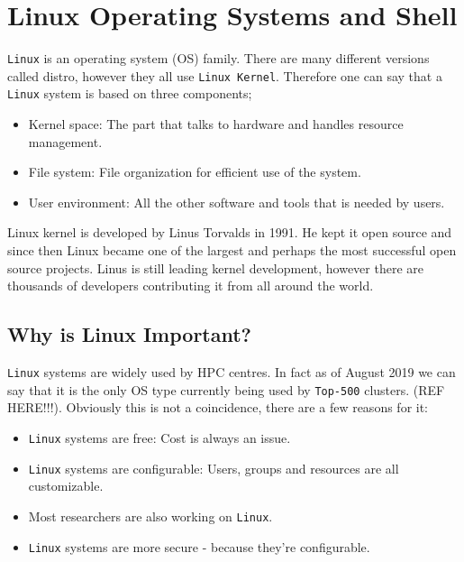 \chapter{Linux Operating Systems and Shell} \label{chap-linux}
\texttt{Linux} is an operating system (OS) family. There are many different versions 
called distro, however they all use \texttt{Linux Kernel}. Therefore one can say that 
a \texttt{Linux} system is based on three components;
\begin{itemize}
  \item Kernel space: The part that talks to hardware and handles resource management.
  \item File system: File organization for efficient use of the system.
  \item User environment: All the other software and tools that is needed by users.
\end{itemize}
Linux kernel is developed by Linus Torvalds in 1991. He kept it open source and since 
then Linux became one of the largest and perhaps the most successful open source 
projects. Linus is still leading kernel development, however there are thousands of 
developers contributing it from all around the world. 

\section{Why is Linux Important?}
\texttt{Linux} systems are widely used by HPC centres. In fact as of August 2019 we can 
say that it is the only OS type currently being used by \texttt{Top-500} clusters. 
(REF HERE!!!). 
\newline \newline
Obviously this is not a coincidence, there are a few reasons for it:
\begin{itemize}
  \item \texttt{Linux} systems are free: Cost is always an issue.
  \item \texttt{Linux} systems are configurable: Users, groups and resources are all 
customizable.
  \item Most researchers are also working on \texttt{Linux}.
  \item \texttt{Linux} systems are more secure - because they're configurable.
\end{itemize}

